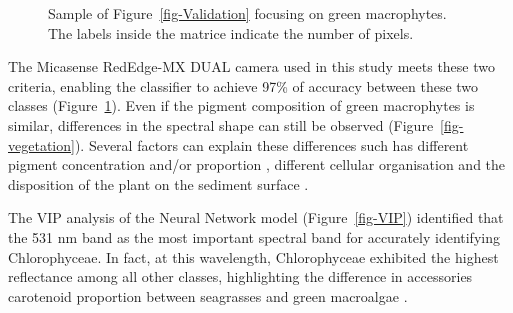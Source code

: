 \documentclass[
  number]{elsarticle}
\begin{document}
\label{cell-fig-ValidationGreen}
\begin{figure}[H]


\caption{\label{fig-ValidationGreen}Sample of
Figure~\ref{fig-Validation} focusing on green macrophytes. The labels
inside the matrice indicate the number of pixels.}

\end{figure}%

The Micasense RedEdge-MX DUAL camera used in this study meets these two
criteria, enabling the classifier to achieve 97\% of accuracy between
these two classes (Figure~\ref{fig-ValidationGreen}). Even if the
pigment composition of green macrophytes is similar, differences in the
spectral shape can still be observed (Figure~\ref{fig-vegetation}).
Several factors can explain these differences such has different pigment
concentration and/or proportion \citep{bargain2013seasonal}, different
cellular organisation and the disposition of the plant on the sediment
surface \citetext{\citealp[ ]{beach1997vivo}; \citealp[
]{kirk1994light}; \citealp{hedley2018influence}}.

The VIP analysis of the Neural Network model (Figure~\ref{fig-VIP})
identified that the 531 nm band as the most important spectral band for
accurately identifying Chlorophyceae. In fact, at this wavelength,
Chlorophyceae exhibited the highest reflectance among all other classes,
highlighting the difference in accessories carotenoid proportion between
seagrasses and green macroalgae \citep{repolho2017seagrass}.
\end{document}
